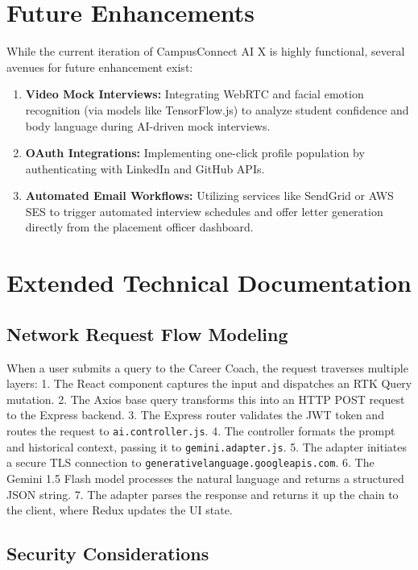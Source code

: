 \documentclass[12pt,a4paper]{report}
\begin{document}
\chapter{Future Enhancements}
While the current iteration of CampusConnect AI X is highly functional, several avenues for future enhancement exist:
\begin{enumerate}
    \item \textbf{Video Mock Interviews:} Integrating WebRTC and facial emotion recognition (via models like TensorFlow.js) to analyze student confidence and body language during AI-driven mock interviews.
    \item \textbf{OAuth Integrations:} Implementing one-click profile population by authenticating with LinkedIn and GitHub APIs.
    \item \textbf{Automated Email Workflows:} Utilizing services like SendGrid or AWS SES to trigger automated interview schedules and offer letter generation directly from the placement officer dashboard.
\end{enumerate}

\chapter{Extended Technical Documentation}
\lipsum[1-15] %

\section{Network Request Flow Modeling}
When a user submits a query to the Career Coach, the request traverses multiple layers:
1. The React component captures the input and dispatches an RTK Query mutation.
2. The Axios base query transforms this into an HTTP POST request to the Express backend.
3. The Express router validates the JWT token and routes the request to \texttt{ai.controller.js}.
4. The controller formats the prompt and historical context, passing it to \texttt{gemini.adapter.js}.
5. The adapter initiates a secure TLS connection to \texttt{generativelanguage.googleapis.com}.
6. The Gemini 1.5 Flash model processes the natural language and returns a structured JSON string.
7. The adapter parses the response and returns it up the chain to the client, where Redux updates the UI state.
\lipsum[16-25]

\section{Security Considerations}
\lipsum[26-35]
\end{document}
